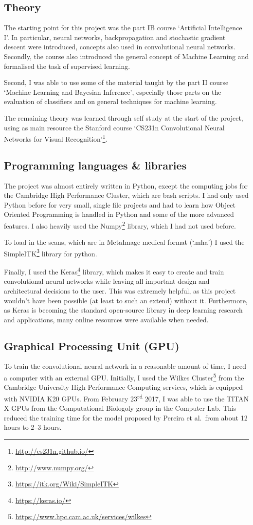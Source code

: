 \documentclass[12pt,a4paper,twoside,openright]{report}
\begin{document}
\subsection{Theory}
The starting point for this project was the part IB course `Artificial Intelligence I'. In particular, neural networks, backpropagation and stochastic gradient descent were introduced, concepts also used in convolutional neural networks. Secondly, the course also introduced the general concept of Machine Learning and formalised the task of supervised learning.

Second, I was able to use some of the material taught by the part II course `Machine Learning and Bayesian Inference', especially those parts on the evaluation of classifiers and on general techniques for machine learning.

The remaining theory was learned through self study at the start of the project, using as main resource the Stanford course `CS231n Convolutional Neural Networks for Visual Recognition'\footnote{\url{http://cs231n.github.io/}}.
\subsection{Programming languages \& libraries}
The project was almost entirely written in Python, except the computing jobs for the Cambridge High Performance Cluster, which are bash scripts. I had only used Python before for very small, single file projects and had to learn how Object Oriented Programming is handled in Python and some of the more advanced features. I also heavily used the Numpy\footnote{\url{http://www.numpy.org/}} library, which I had not used before.

To load in the scans, which are in MetaImage medical format (`.mha') I used the SimpleITK\footnote{\url{https://itk.org/Wiki/SimpleITK}} library for python.

Finally, I used the Keras\footnote{\url{https://keras.io/}} library, which makes it easy to create and train convolutional neural networks while leaving all important design and architectural decisions to the user. This was extremely helpful, as this project wouldn't have been possible (at least to such an extend) without it. Furthermore, as Keras is becoming the standard open-source library in deep learning research and applications, many online resources were available when needed.

\subsection{Graphical Processing Unit (GPU)}
To train the convolutional neural network in a reasonable amount of time, I need a computer with an external GPU. Initially, I used the Wilkes Cluster\footnote{\url{https://www.hpc.cam.ac.uk/services/wilkes}} from the Cambridge University High Performance Computing services, which is equipped with NVIDIA K20 GPUs. From February 23\textsuperscript{rd} 2017, I was able to use the TITAN X GPUs from the Computational Biologoly group in the Computer Lab. This reduced the training time for the model proposed by Pereira et al.\ from about 12 hours to 2--3 hours.
\end{document}

